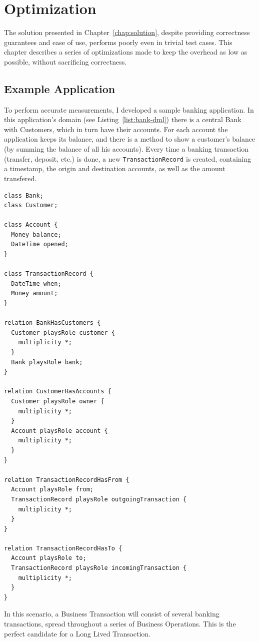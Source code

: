 \chapter{Optimization}

The solution presented in Chapter~\ref{chap:solution}, despite
providing correctness guarantees and ease of use, performs poorly even
in trivial test cases. This chapter describes a series of
optimizations made to keep the overhead as low as possible, without
sacrificing correctness.

\section{Example Application}

To perform accurate measurements, I developed a sample banking
application. In this application's domain (see
Listing~\ref{list:bank-dml}) there is a central Bank with Customers,
which in turn have their accounts. For each account the application
keeps its balance, and there is a method to show a customer's balance
(by summing the balance of all his accounts). Every time a banking
transaction (transfer, deposit, etc.) is done, a new
\texttt{TransactionRecord} is created, containing a timestamp, the
origin and destination accounts, as well as the amount transfered.

\begin{lstlisting}[caption={Domain Model for the Banking Application},
  label={list:bank-dml},float]
class Bank;
class Customer;

class Account {
  Money balance;
  DateTime opened;
}

class TransactionRecord {
  DateTime when;
  Money amount;
}

relation BankHasCustomers {
  Customer playsRole customer {
    multiplicity *;
  }
  Bank playsRole bank;
}

relation CustomerHasAccounts {
  Customer playsRole owner {
    multiplicity *;
  }
  Account playsRole account {
    multiplicity *;
  }
}

relation TransactionRecordHasFrom {
  Account playsRole from;
  TransactionRecord playsRole outgoingTransaction {
    multiplicity *;
  }
}

relation TransactionRecordHasTo {
  Account playsRole to;
  TransactionRecord playsRole incomingTransaction {
    multiplicity *;
  }
}
\end{lstlisting}

In this scenario, a Business Transaction will consist of several
banking transactions, spread throughout a series of Business
Operations. This is the perfect candidate for a Long Lived
Transaction.

